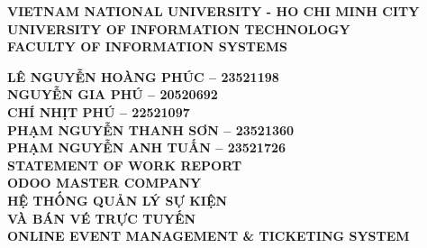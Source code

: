 \documentclass[13pt,a4paper]{extreport} %
\begin{document}
\begin{titlepage}

    \centering

    {\fontsize{14pt}{16.8pt}\selectfont\bfseries VIETNAM NATIONAL UNIVERSITY - HO CHI MINH CITY}\\[0.2cm]
    {\fontsize{16pt}{19.2pt}\selectfont\bfseries UNIVERSITY OF INFORMATION TECHNOLOGY}\\[0.2cm]
    {\fontsize{16pt}{19.2pt}\selectfont\bfseries FACULTY OF INFORMATION SYSTEMS}\\[1.5cm]

    \vspace{1.5cm} %

    {\fontsize{14pt}{16.8pt}\selectfont\bfseries LÊ NGUYỄN HOÀNG PHÚC – 23521198}\\[0.4cm]
    {\fontsize{14pt}{16.8pt}\selectfont\bfseries NGUYỄN GIA PHÚ – 20520692}\\[0.5cm]
    {\fontsize{14pt}{16.8pt}\selectfont\bfseries CHÍ NHỊT PHÚ – 22521097}\\[0.4cm]
    {\fontsize{14pt}{16.8pt}\selectfont\bfseries PHẠM NGUYỄN THANH SƠN – 23521360}\\[0.5cm]
    {\fontsize{14pt}{16.8pt}\selectfont\bfseries PHẠM NGUYỄN ANH TUẤN – 23521726}\\[0.6cm]
    
    {\fontsize{16pt}{19.2pt}\selectfont\bfseries STATEMENT OF WORK REPORT}\\[0.6cm]
    {\fontsize{16pt}{19.2pt}\selectfont\bfseries ODOO MASTER COMPANY}\\[0.3cm]
    {\fontsize{22pt}{26.4pt}\selectfont\bfseries HỆ THỐNG QUẢN LÝ SỰ KIỆN\\VÀ BÁN VÉ TRỰC TUYẾN}\\[0.5cm]
    {\color{red}\fontsize{16pt}{19.2pt}\selectfont\bfseries ONLINE EVENT MANAGEMENT \& TICKETING SYSTEM}\\[2cm]


\end{titlepage}
\end{document}
